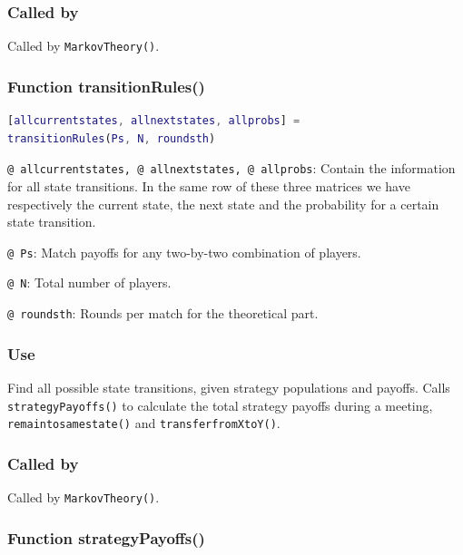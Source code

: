 \documentclass[12pt]{report}
\begin{document}
\subsubsection*{Called by}
Called by \texttt{MarkovTheory()}.







\subsubsection*{Function transitionRules()}

\begin{lstlisting}[language=Matlab]
[allcurrentstates, allnextstates, allprobs] = 
transitionRules(Ps, N, roundsth)

\end{lstlisting}

\texttt{@ allcurrentstates, @ allnextstates, @ allprobs}: Contain the information for all state transitions. In the same row of these three matrices we have respectively the current state, the next state and the probability for a certain state transition.

\texttt{@ Ps}: Match payoffs for any two-by-two combination of players.

\texttt{@ N}: Total number of players.

\texttt{@ roundsth}: Rounds per match for the theoretical part.

\subsubsection*{Use}
Find all possible state transitions, given strategy populations and payoffs. Calls \texttt{strategyPayoffs()} to calculate the total strategy payoffs during a meeting, \texttt{remaintosamestate()} and \texttt{transferfromXtoY()}.

\subsubsection*{Called by}
Called by \texttt{MarkovTheory()}.







\subsubsection*{Function strategyPayoffs()}
\end{document}
